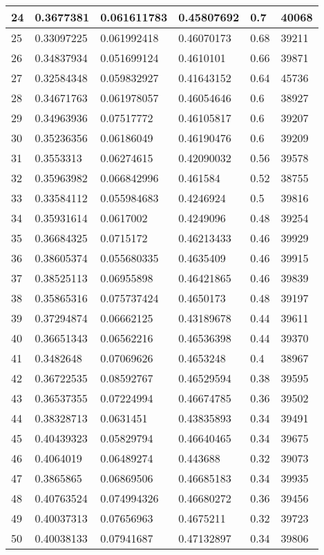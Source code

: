 \begin{longtable}{|l|l|l|l|l|l|}
24 & 0.3677381 & 0.061611783 & 0.45807692 & 0.7 & 40068 \\ \hline 
25 & 0.33097225 & 0.061992418 & 0.46070173 & 0.68 & 39211 \\ \hline 
26 & 0.34837934 & 0.051699124 & 0.4610101 & 0.66 & 39871 \\ \hline 
27 & 0.32584348 & 0.059832927 & 0.41643152 & 0.64 & 45736 \\ \hline 
28 & 0.34671763 & 0.061978057 & 0.46054646 & 0.6 & 38927 \\ \hline 
29 & 0.34963936 & 0.07517772 & 0.46105817 & 0.6 & 39207 \\ \hline 
30 & 0.35236356 & 0.06186049 & 0.46190476 & 0.6 & 39209 \\ \hline 
31 & 0.3553313 & 0.06274615 & 0.42090032 & 0.56 & 39578 \\ \hline 
32 & 0.35963982 & 0.066842996 & 0.461584 & 0.52 & 38755 \\ \hline 
33 & 0.33584112 & 0.055984683 & 0.4246924 & 0.5 & 39816 \\ \hline 
34 & 0.35931614 & 0.0617002 & 0.4249096 & 0.48 & 39254 \\ \hline 
35 & 0.36684325 & 0.0715172 & 0.46213433 & 0.46 & 39929 \\ \hline 
36 & 0.38605374 & 0.055680335 & 0.4635409 & 0.46 & 39915 \\ \hline 
37 & 0.38525113 & 0.06955898 & 0.46421865 & 0.46 & 39839 \\ \hline 
38 & 0.35865316 & 0.075737424 & 0.4650173 & 0.48 & 39197 \\ \hline 
39 & 0.37294874 & 0.06662125 & 0.43189678 & 0.44 & 39611 \\ \hline 
40 & 0.36651343 & 0.06562216 & 0.46536398 & 0.44 & 39370 \\ \hline 
41 & 0.3482648 & 0.07069626 & 0.4653248 & 0.4 & 38967 \\ \hline 
42 & 0.36722535 & 0.08592767 & 0.46529594 & 0.38 & 39595 \\ \hline 
43 & 0.36537355 & 0.07224994 & 0.46674785 & 0.36 & 39502 \\ \hline 
44 & 0.38328713 & 0.0631451 & 0.43835893 & 0.34 & 39491 \\ \hline 
45 & 0.40439323 & 0.05829794 & 0.46640465 & 0.34 & 39675 \\ \hline 
46 & 0.4064019 & 0.06489274 & 0.443688 & 0.32 & 39073 \\ \hline 
47 & 0.3865865 & 0.06869506 & 0.46685183 & 0.34 & 39935 \\ \hline 
48 & 0.40763524 & 0.074994326 & 0.46680272 & 0.36 & 39456 \\ \hline 
49 & 0.40037313 & 0.07656963 & 0.4675211 & 0.32 & 39723 \\ \hline 
50 & 0.40038133 & 0.07941687 & 0.47132897 & 0.34 & 39806 \\ \hline 
\end{longtable}